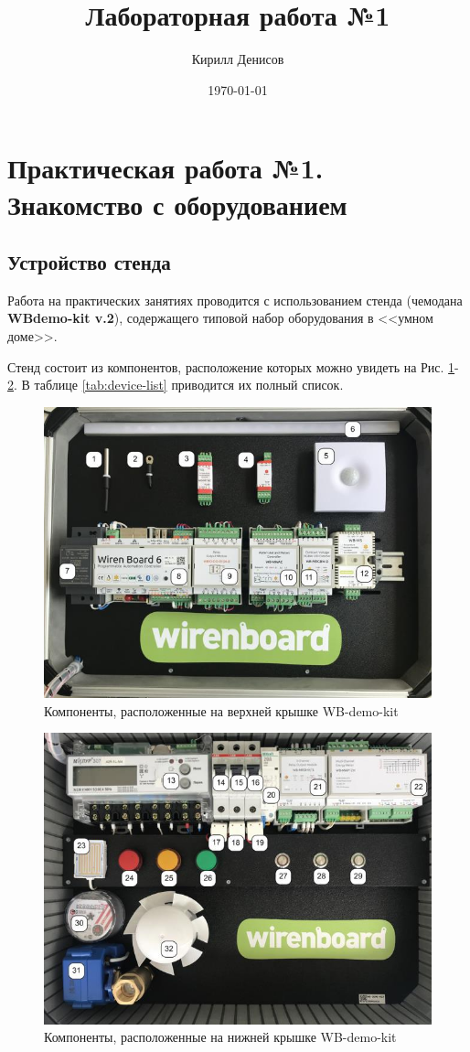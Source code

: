 \documentclass[a4paper,14pt]{extarticle}
\author{Кирилл Денисов}
\title{Лабораторная работа №1}
\date{\today}
\newcommand{\pathToCommonFolder}{/home/denilai/Documents/repos/latex/Common}
\begin{document}
	\thispagestyle{empty}
	
	\newpage
	\tableofcontents
	\newpage
	

\section{Практическая работа №1.\\Знакомство с оборудованием}

\subsection {Устройство стенда}
Работа на практических занятиях проводится с использованием стенда (чемодана\textbf{ WBdemo-kit v.2}), содержащего типовой набор оборудования в <<умном доме>>.

Стенд состоит из компонентов, расположение которых можно увидеть на Рис. \ref{fig:wb-demo-kit1}-\ref{fig:wb-demo-kit2}. В таблице \ref{tab:device-list} приводится их полный список.
 
\begin{figure}[htpb]
	\centering
	\includegraphics[width=0.6\linewidth]{images/wb-demo-kit1}
	\caption{Компоненты, расположенные на верхней крышке WB-demo-kit}
	\label{fig:wb-demo-kit1}
\end{figure}
 
 \begin{figure}[htpb]
 	\centering
 	\includegraphics[width=0.6\linewidth]{images/wb-demo-kit2}
 	\caption{Компоненты, расположенные на нижней крышке WB-demo-kit}
 	\label{fig:wb-demo-kit2}
 \end{figure}
\end{document}
